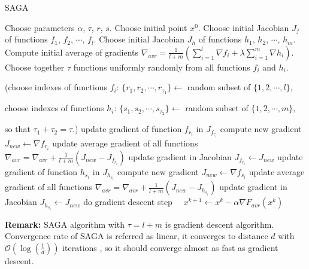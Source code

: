 \documentclass[11pt]{book}
\begin{document}
\begin{algorithm}[H]
	\caption{SAGA \cite{SAGA}}
	\label{alg:saga}
	\begin{algorithmic}[1]
		\State Choose parameters $\alpha$, $\tau$, $r$, $s$.
		\State Choose initial point $x^0$.
		\State Choose initial Jacobian $J_f$ of functions $f_1$, $f_2$, $\cdots$, $f_l$.
		\State Choose initial Jacobian $J_h$ of functions $h_1$, $h_2$, $\cdots$, $h_m$.
		\State Compute initial average of gradients $\nabla_{avr} = \frac{1}{l+m} \left( \sum_{i=1}^l \nabla f_i + \lambda\sum_{i=1}^m \nabla h_i \right)$.
		\State Choose together $\tau$ functions uniformly randomly from all functions $f_i$ and $h_i$.
		
		(choose indexes of functions $f_i$: $\{r_1, r_2, \cdots, r_{\tau_1} \} \leftarrow$ random subset of $\{1,2,\cdots, l \},$
		
		choose indexes of functions $h_i$: $\{s_1, s_2, \cdots, s_{\tau_2} \} \leftarrow$ random subset of $\{1,2,\cdots, m \},$
		
		so that $\tau_1 + \tau_2=\tau.$)
		 update gradient of function $f_{r_i}$ in $J_{f_{r_i}}$
		\State compute new gradient $J_{new} \leftarrow \nabla f_{r_i}$
		\State update average gradient of all functions $\nabla_{avr}=\nabla_{avr}+\frac{1}{l+m}(J_{new}-J_{f_{r_i}})$
		\State update gradient in Jacobian
		$J_{f_{r_i}} \leftarrow J_{new}$
		\EndFor
		 update gradient of function $h_{s_i}$ in $J_{h_{s_i}}$
		\State compute new gradient $J_{new} \leftarrow \nabla f_{s_i}$
		\State update average gradient of all functions $\nabla_{avr}=\nabla_{avr}+\frac{1}{l+m}(J_{new}-J_{h_{s_i}})$
		\State update gradient in Jacobian
		$J_{h_{s_i}} \leftarrow J_{new}$
		\EndFor
		\State do gradient descent step $\quad x^{k+1} \leftarrow x^k - \alpha\nabla F_{avr}(x^k) \quad$
		\EndFor
	\end{algorithmic}
\end{algorithm}

\textbf{Remark:} SAGA algorithm with $\tau=l+m$ is gradient descent algorithm.\\

Convergence rate of SAGA is referred as linear, it converges to distance $d$ with $\mathcal{O}(\log(\frac{1}{d}))$ iterations \cite{SAGA}, so it should converge almost as fast as gradient descent.\\
\end{document}
